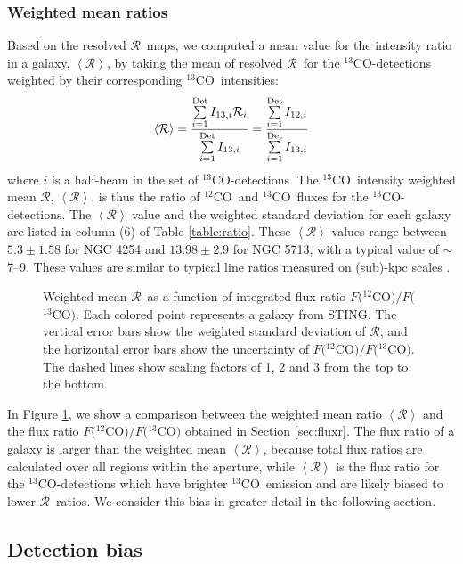 \documentclass{emulateapj}
\def\beq{\begin{equation}}
\def\eeq{\end{equation}}
\def\ttco{\mbox{$^{13}$CO}}
\def\twco{\mbox{$^{12}$CO}}
\def\rtt{$\mathcal{R}$}
\begin{document}
\subsubsection{Weighted mean ratios} 
Based on the resolved \rtt \ maps,
we computed a mean value for the intensity ratio in a galaxy, $\left<\mathcal{R}\right>$, 
by taking the mean of resolved \rtt \ for the \ttco-detections    
weighted by their corresponding \ttco \ intensities:   
\beq
\left<\mathcal{R}\right> = \frac{\sum\limits_{i=1}^{\rm Det}
  I_{13,i}\mathcal{R}_{i}}{\sum\limits_{i=1}^{\rm Det} I_{13,i}}
= \frac{\sum\limits_{i=1}^{\rm Det} I_{12,i}}{\sum\limits_{i=1}^{\rm Det} I_{13,i}}
\eeq
where $i$ is a half-beam in the set of \ttco-detections. 
The \ttco \ intensity weighted mean \rtt, $\left<\mathcal{R}\right>$, is thus
the ratio of \twco \ and \ttco \ fluxes for the \ttco-detections.  
The $\left<\mathcal{R}\right>$ value  
and the weighted standard deviation for each galaxy  
are listed in column (6) of Table \ref{table:ratio}.  
These $\left<\mathcal{R}\right>$ values range between $5.3 \pm 1.58$ for NGC 4254
and $13.98 \pm 2.9$ for NGC 5713, with a typical value of $\sim$ 7--9. 
These values are similar to typical line ratios measured on (sub)-kpc scales 
\citep[e.g.][]{Paglione2001, Hirota2010, Wilson1994}.  


\begin{figure}
\caption{Weighted mean \rtt \ as a function of integrated flux ratio 
$F($\twco$)/F($\ttco$)$. Each colored point represents a galaxy from STING. 
The vertical error bars show the weighted standard deviation of \rtt, 
and the horizontal error bars show the uncertainty of $F($\twco$)/F($\ttco$)$. 
The dashed lines show scaling factors of 1, 2 and 3 from the top to
the bottom.}
\label{fig:rvsfr}
\end{figure}

In Figure \ref{fig:rvsfr}, we show  
a comparison between the weighted mean ratio
$\left<\mathcal{R}\right>$ 
and the flux ratio $F($\twco$)/F($\ttco$)$ obtained 
in Section \ref{sec:fluxr}.
The flux ratio of a galaxy is larger than 
the weighted mean $\left<\mathcal{R}\right>$,
because total flux ratios are calculated over all 
regions within the aperture, 
while $\left<\mathcal{R}\right>$ 
is the flux ratio for the \ttco-detections which  
have brighter \ttco \ emission and are likely biased to lower \rtt \ ratios. 
We consider this bias in greater detail in the following section.


\subsection{Detection bias} \label{sec:bias}
 
\end{document}
